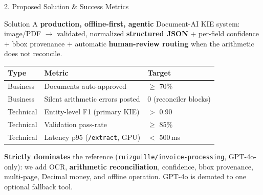 \documentclass[10pt,aspectratio=169]{beamer}
\begin{document}
\begin{frame}{2. Proposed Solution \& Success Metrics}
\begin{block}{Solution}
A \textbf{production, offline-first, agentic} Document-AI KIE system: image/PDF $\to$ validated, normalized \textbf{structured JSON} + per-field confidence + bbox provenance + automatic \textbf{human-review routing} when the arithmetic does not reconcile.
\end{block}

\begin{table}[h]
\centering\small
\begin{tabular}{lll}
\toprule
\textbf{Type} & \textbf{Metric} & \textbf{Target} \\
\midrule
Business  & Documents auto-approved             & $\geq$ 70\% \\
Business  & Silent arithmetic errors posted     & 0 (reconciler blocks) \\
Technical & Entity-level F1 (primary KIE)        & $>$ 0.90 \\
Technical & Validation pass-rate                 & $\geq$ 85\% \\
Technical & Latency p95 (\texttt{/extract}, GPU) & $<$ 500\,ms \\
\bottomrule
\end{tabular}
\end{table}

\scriptsize \textbf{Strictly dominates} the reference (\texttt{ruizguille/invoice-processing}, GPT-4o-only): we add OCR, \textbf{arithmetic reconciliation}, confidence, bbox provenance, multi-page, Decimal money, and offline operation. GPT-4o is demoted to one optional fallback tool.
\end{frame}
\end{document}
